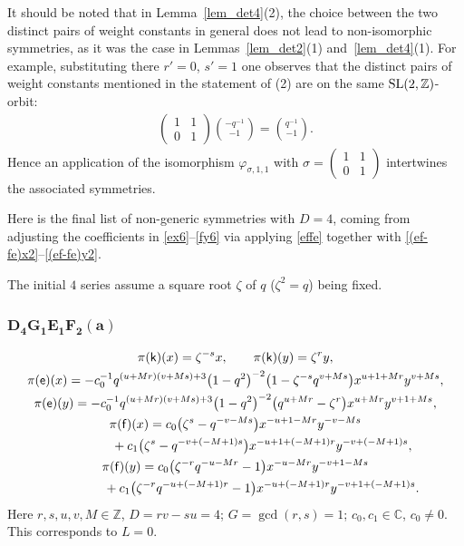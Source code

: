 \documentclass[pdftex]{sigma}
\numberwithin{equation}{section}
\begin{document}
\begin{Remark}It should be noted that in Lemma~\ref{lem_det4}(2), the choice between the two distinct pairs of weight constants in general does not lead to non-isomorphic symmetries, as it was the case in Lemmas~\ref{lem_det2}(1) and~\ref{lem_det4}(1). For example, substituting there $r'=0$, $s'=1$ one observes that the distinct pairs of weight constants mentioned in the statement of (2) are on the same ${\rm SL}(2,\mathbb{Z})$-orbit:
\begin{gather*}
\begin{pmatrix}1 & 1\\ 0 & 1\end{pmatrix}\binom{-q^{-1}}{-1}=\binom{q^{-1}}{-1}.
\end{gather*}
Hence an application of the isomorphism $\varphi_{\sigma,1,1}$ with $\sigma= \left(\begin{smallmatrix}1 & 1\\ 0 & 1\end{smallmatrix}\right)$ intertwines the associated symmetries.
\end{Remark}

Here is the final list of non-generic symmetries with $D=4$, coming from adjusting the coefficients in \eqref{ex6}--\eqref{fy6} via applying \eqref{effe} together with \eqref{(ef-fe)x2}--\eqref{(ef-fe)y2}.

The initial $4$ series assume a square root $\zeta$ of $q$ ($\zeta^2=q$) being fixed.

\subsubsection*{$\boldsymbol{D_4G_1E_1F_2(a)}$}
\begin{gather*}
\pi(\mathsf{k})(x)= \zeta^{-s}x ,\qquad\pi(\mathsf{k})(y)=\zeta^ry ,\\
\pi(\mathsf{e})(x)= -c_0^{-1}q^{(u+Mr)(v+Ms)+3}\big(1-q^2\big)^{-2}\big(1-\zeta^{-s}q^{v+Ms}\big)x^{u+1+Mr}y^{v+Ms} ,\\
\pi(\mathsf{e})(y)= -c_0^{-1}q^{(u+Mr)(v+Ms)+3}\big(1-q^2\big)^{-2}\big(q^{u+Mr}-\zeta^r\big)x^{u+Mr}y^{v+1+Ms} ,\\
\pi(\mathsf{f})(x)= c_0\big(\zeta^s-q^{-v-Ms}\big)x^{-u+1-Mr}y^{-v-Ms}\\
\hphantom{\pi(\mathsf{f})(x)=}{} + c_1\big(\zeta^s-q^{-v+(-M+1)s}\big)x^{-u+1+(-M+1)r}y^{-v+(-M+1)s} ,\\
\pi(\mathsf{f})(y)= c_0\big(\zeta^{-r}q^{-u-Mr}-1\big)x^{-u-Mr}y^{-v+1-Ms}\\
\hphantom{\pi(\mathsf{f})(y)=}{} + c_1\big(\zeta^{-r}q^{-u+(-M+1)r}-1\big)x^{-u+(-M+1)r}y^{-v+1+(-M+1)s} .
\end{gather*}
Here $r,s,u,v,M\in\mathbb{Z}$, $D=rv-su=4$; $G=\operatorname{gcd}(r,s)=1$; $c_0,c_1\in\mathbb{C}$, $c_0\ne 0$. This corresponds to $L=0$.
\end{document}
